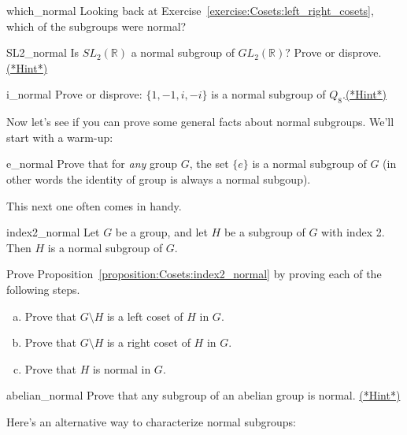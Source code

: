 \begin{exercise}{which_normal}
Looking back at Exercise~\ref{exercise:Cosets:left_right_cosets}, which of the subgroups were normal?
\end{exercise}

\begin{exercise}{SL2_normal}
Is $SL_2( {\mathbb R} )$ a normal subgroup of $GL_2( {\mathbb R})?$  Prove or disprove.
\hyperref[sec:Cosets:Hints]{(*Hint*)}
\end{exercise}

\begin{exercise}{i_normal}
Prove or disprove:  $\{ 1, -1, i, -i \}$ is a normal subgroup of $Q_8$.\hyperref[sec:Cosets:Hints]{(*Hint*)}
\end{exercise}

Now let's see if you can prove some general facts about normal subgroups.  We'll start with a warm-up:


\begin{exercise}{e_normal}
Prove that for \emph{any} group $G$, the set $\{e\}$ is a normal subgroup of $G$ (in other words the identity of group is always a normal subgoup).
\end{exercise} 

This next one often comes in handy.

\begin{prop}{index2_normal} Let $G$ be a group, and let $H$ be a subgroup of $G$ with index 2. Then $H$ is a normal subgroup of $G$.
\end{prop}
\begin{exercise}{}
Prove Proposition~\ref{proposition:Cosets:index2_normal} by proving each of the following steps.
\begin{enumerate}[(a)]
\item
Prove that $G \setminus H$ is a left coset of $H$ in $G$.
\item
Prove that $G \setminus H$ is a right coset of $H$ in $G$.
\item 
Prove that $H$ is normal in $G$.
\end{enumerate}
\end{exercise}

\begin{exercise}{abelian_normal} Prove that any subgroup of an abelian group is normal.
\hyperref[sec:Cosets:Hints]{(*Hint*)}
\end{exercise}


Here's an alternative way to characterize normal subgroups:


